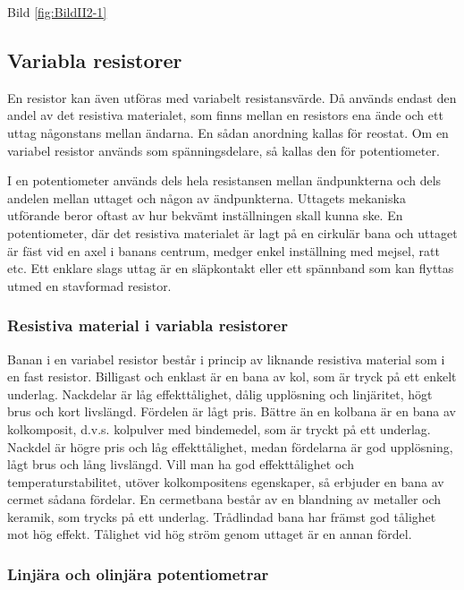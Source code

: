 Bild \ref{fig:BildII2-1}

\subsection{Variabla resistorer}

En resistor kan även utföras med variabelt resistansvärde. Då används endast
den andel av det resistiva materialet, som finns mellan en resistors ena ände
och ett uttag någonstans mellan ändarna. En sådan anordning kallas för reostat.
Om en variabel resistor används som spänningsdelare, så kallas den för
potentiometer.

I en potentiometer används dels hela resistansen mellan ändpunkterna och dels
andelen mellan uttaget och någon av ändpunkterna. Uttagets mekaniska utförande
beror oftast av hur bekvämt inställningen skall kunna ske. En potentiometer,
där det resistiva materialet är lagt på en cirkulär bana och uttaget är fäst
vid en axel i banans centrum, medger enkel inställning med mejsel, ratt etc.
Ett enklare slags uttag är en släpkontakt eller ett spännband som kan flyttas
utmed en stavformad resistor.

\subsubsection{Resistiva material i variabla resistorer}

Banan i en variabel resistor består i princip av liknande resistiva material
som i en fast resistor. Billigast och enklast är en bana av kol, som är tryck
på ett enkelt underlag. Nackdelar är låg effekttålighet, dålig upplösning och
linjäritet, högt brus och kort livslängd. Fördelen är lågt pris.
Bättre än en kolbana är en bana av kolkomposit, d.v.s. kolpulver med bindemedel,
som är tryckt på ett underlag. Nackdel är högre pris och låg effekttålighet,
medan fördelarna är god upplösning, lågt brus och lång livslängd.
Vill man ha god effekttålighet och temperaturstabilitet, utöver kolkompositens
egenskaper, så erbjuder en bana av cermet sådana fördelar. En cermetbana består
av en blandning av metaller och keramik, som trycks på ett underlag.
Trådlindad bana har främst god tålighet mot hög effekt. Tålighet vid hög ström
genom uttaget är en annan fördel.

\subsubsection{Linjära och olinjära potentiometrar}

